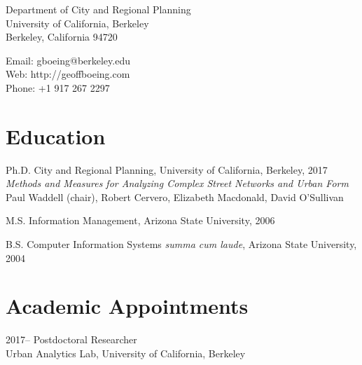 \documentclass{academiccv}
\begin{document}
\raggedright

\namefont{\myname}

\vspace{1em}
\begin{minipage}[t]{0.495\textwidth}
  Department of City and Regional Planning \\
  University of California, Berkeley \\
  Berkeley, California 94720
\end{minipage}
\begin{minipage}[t]{0.495\textwidth}
  Email: gboeing@berkeley.edu \\
  Web: http://geoffboeing.com \\
  Phone: +1 917 267 2297
\end{minipage}
\vspace{0.5em}



\section*{Education}

\begin{tablist}
\item[Ph.D.] \tab City and Regional Planning, University of California, Berkeley, 2017 \\
                  \emph{Methods and Measures for Analyzing Complex Street Networks and Urban Form} \\
                  Paul Waddell (chair), Robert Cervero, Elizabeth Macdonald, David O'Sullivan
\item[M.S.]  \tab Information Management, Arizona State University, 2006
\item[B.S.]  \tab Computer Information Systems \emph{summa cum laude}, Arizona State University, 2004
\end{tablist}



\section*{Academic Appointments}
\begin{tablist}
	\item[2017--] \tab Postdoctoral Researcher \\
	Urban Analytics Lab, University of California, Berkeley
\end{tablist}
\end{document}
